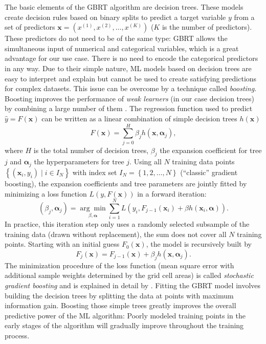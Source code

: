 The basic elements of the \ac{GBRT} algorithm are decision trees. These models
create decision rules based on binary splits to predict a target variable $y$
from a set of predictors $\bm{x} = \left( x^{(1)}, x^{(2)}, \ldots, x^{(K)}
\right)$ ($K$ is the number of predictors). These predictors do not need to be
of the same type: \ac{GBRT} allows the simultaneous input of numerical and
categorical variables, which is a great advantage for our use case. There is no
need to encode the categorical predictors in any way. Due to their simple
nature, \acf{ML} models based on decision trees are easy to interpret and
explain but cannot be used to create satisfying predictions for complex
datasets. This issue can be overcome by a technique called \emph{boosting}.
Boosting improves the performance of \emph{weak learners} (in our case decision
trees) by combining a large number of them  \autocite{Freund1996}. The
regression function used to predict $\hat{y} = F(\bm{x})$ can be written as a
linear combination of simple decision trees $h(\bm{x})$
\begin{equation}
  F(\bm{x}) = \sum_{j=0}^{H} \beta_j h(\bm{x}, \bm{\alpha}_j),
  \label{eq:app:b:f_x_sum}
\end{equation}
where $H$ is the total number of decision trees, $\beta_j$ the expansion
coefficient for tree $j$ and $\bm{\alpha}_j$ the hyperparameters for tree $j$.
Using all $N$ training data points $\left\{ \left( \bm{x}_i, y_i \right) \mid i
\in I_N \right\}$ with index set $I_N = \left\{ 1, 2, \ldots, N \right\}$
(\enquote{classic} gradient boosting), the expansion coefficients and tree
parameters are jointly fitted by minimizing a loss function $L \left( y,
F(\bm{x}) \right)$ in a forward iteration:
\begin{equation}
  \left( \beta_j, \bm{\alpha}_j \right) = \underset{\beta,
    \bm{\alpha}}{\arg\min} \sum_{i=1}^{N} L \left( y_i, F_{j-1}(\bm{x}_i) +
  \beta h(\bm{x}_i, \bm{\alpha}) \right).
  \label{eq:app:b:beta_alpha}
\end{equation}
In practice, this iteration step only uses a randomly selected subsample of the
training data (drawn without replacement), \ie{} the sum does not cover all $N$
training points. Starting with an initial guess $F_0(\bm{x})$, the model is
recursively built by
\begin{equation}
  F_j(\bm{x}) = F_{j-1}(\bm{x}) + \beta_j h(\bm{x}, \bm{\alpha}_j).
  \label{eq:app:b:f_x_recursion}
\end{equation}
The minimization procedure of the loss function (mean square error with
additional sample weights determined by the grid cell areas) is called
\emph{stochastic gradient boosting} and is explained in detail by
\textcite{Friedman2001, Friedman2002}. Fitting the \ac{GBRT} model involves
building the decision trees by splitting the data at points with maximum
information gain. Boosting those simple trees greatly improves the overall
predictive power of the \ac{ML} algorithm: Poorly modeled training points in
the early stages of the algorithm will gradually improve throughout the
training process.

